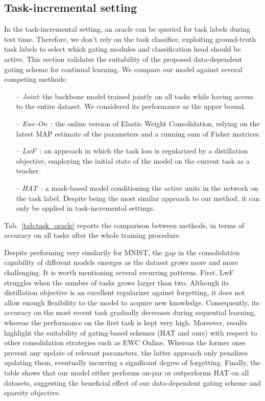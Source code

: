 \documentclass[10pt,twocolumn,letterpaper]{article}
\begin{document}
\subsection{Task-incremental setting}
In the task-incremental setting, an oracle can be queried for task labels during test time. Therefore, we don't rely on the task classifier, exploiting ground-truth task labels to select which gating modules and classification head should be active. This section validates the suitability of the proposed data-dependent gating scheme for continual learning.
We compare our model against several competing methods:
\begin{itemize}[noitemsep]
    \item[--] \textit{Joint}: the backbone model trained jointly on all tasks while having access to the entire dataset. We considered its performance as the upper bound.
    \item[--] \textit{Ewc-On}~\cite{progressandcompress}: the online version of Elastic Weight Consolidation, relying on the latest MAP estimate of the parameters and a running sum of Fisher matrices.
    \item[--] \textit{LwF}~\cite{lwf}: an approach in which the task loss is regularized by a distillation objective, employing the initial state of the model on the current task as a teacher.
    \item[--] \textit{HAT}~\cite{hat}: a mask-based model conditioning the active units in the network on the task label. Despite being the most similar approach to our method, it can only be applied in task-incremental settings.
\end{itemize}
Tab.~\ref{tab:task_oracle} reports the comparison between methods, in terms of accuracy on all tasks after the whole training procedure.

Despite performing very similarily for MNIST, the gap in the consolidation capability of different models emerges as the dataset grows more and more challenging. It is worth mentioning several recurring patterns. 
First, LwF struggles when the number of tasks grows larger than two. Although its distillation objective is an excellent regularizer against forgetting, it does not allow enough flexibility to the model to acquire new knowledge. Consequently, its accuracy on the most recent task gradually decreases during sequential learning, whereas the performance on the first task is kept very high.
Moreover, results highlight the suitability of gating-based schemes (HAT and ours) with respect to other consolidation strategies such as EWC Online. Whereas the former ones prevent any update of relevant parameters, the latter approach only penalizes updating them, eventually incurring a significant degree of forgetting. Finally, the table shows that our model either performs on-par or outperforms HAT on all datasets, suggesting the beneficial effect of our data-dependent gating scheme and sparsity objective.
\end{document}
